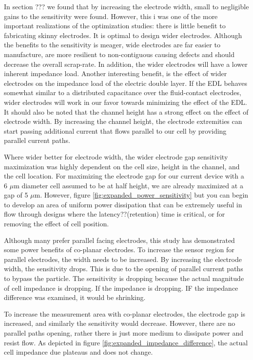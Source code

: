 \par In section ??? we found that by increasing the electrode width, small to negligible gains to the sensitivity were found. However, this i was one of the more important realizations of the optimization studies: there is little benefit to fabricating skinny electrodes. It is optimal to design wider electrodes. Although the benefits to the sensitivity is meager, wide electrodes are far easier to manufacture, are more resilient to non-contiguous causing defects and should decrease the overall scrap-rate. In addition, the wider electrodes will have a lower inherent impedance load. Another interesting benefit, is the effect of wider electrodes on the impedance load of the electric double layer. If the EDL behaves somewhat similar to a distributed capacitance over the fluid-contact electrodes, wider electrodes will work in our favor towards minimizing the effect of the EDL. It should also be noted that the channel height has a strong effect on the effect of electrode width. By increasing the channel height, the electrode extremities can start passing additional current that flows parallel to our cell by providing parallel current paths.

\par Where wider better for electrode width, the wider electrode gap sensitivity maximization was highly dependent on the cell size, height in the channel, and the cell location. For maximizing the electrode gap for our current device with a 6 $\mu$m diameter cell assumed to be at half height, we are already maximized at a gap of 5 $\mu$m. However, figure \ref{fig:expanded_power_sensitivity} but you can begin to develop an area of uniform power dissipation that can be extremely useful in flow through designs where the latency??(retention) time is critical, or for removing the effect of cell position. 

\par Although many prefer parallel facing electrodes, this study has demonstrated some power benefits of co-planar electrodes. To increase the sensor region for parallel electrodes, the width needs to be increased. By increasing the electrode width, the sensitivity drops. This is due to the opening of parallel current paths to bypass the particle. The sensitivity is dropping because the actual magnitude of cell impedance is dropping. If the impedance is dropping. IF the impedance difference was examined, it would be shrinking.

\par To increase the measurement area with co-planar electrodes, the electrode gap is increased, and similarly the sensitivity would decrease. However, there are no parallel paths opening, rather there is just more medium to dissipate power and resist flow. As depicted in figure \ref{fig:expanded_impedance_difference}, the actual cell impedance due plateaus and does not change.

